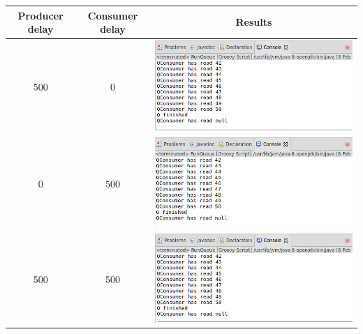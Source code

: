 \begin{tabular}{c|c|c}
	\hline

	Producer delay &
	Consumer delay &
	Results \\
	\hline

	500 &
	0 &
	\includegraphics[width=\textwidth / 2]{img/screenshots/5-1-1.png} \\
	\hline

	0 &
	500 &
	\includegraphics[width=\textwidth / 2]{img/screenshots/5-1-2.png} \\
	\hline

	500 &
	500 &
	\includegraphics[width=\textwidth / 2]{img/screenshots/5-1-3.png} \\
	\hline

\end{tabular}

